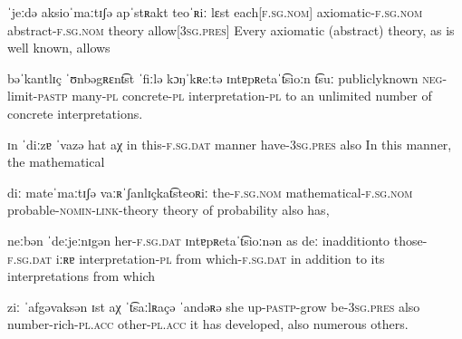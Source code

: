 
              {ˈjeːdə aksioˈmaːtɪʃə apˈstʀakt teoˈʀiː lɛst}
              {each[\textsc{f}.\textsc{sg}.\textsc{nom}] axiomatic-\textsc{f}.\textsc{sg}.\textsc{nom} abstract-\textsc{f}.\textsc{sg}.\textsc{nom} theory allow[3\textsc{sg}.\textsc{pres}]}
              {{Every} {axiomatic} {(abstract)} theory, {as is well known, allows}}

              {bəˈkantlɪç ˈʊnbəgʀɛn\t{ts}t ˈfiːlə kɔŋˈkʀeːtə ɪntɐpʀetaˈ\t{ts}ioːn \t{ts}uː}
              {{publicly{\textunderscore}known} \textsc{neg}-limit-\textsc{pastp} many-\textsc{pl} concrete-\textsc{pl} interpretation-\textsc{pl} to}
              {{an} {unlimited} {number of} concrete interpretations.}

              {ɪn ˈdiːzɐ ˈvazə hat aχ}
              {in this-\textsc{f}.\textsc{sg}.\textsc{dat} manner have-\textsc{3sg}.\textsc{pres} also}
              {In this manner, {the} {mathematical}}

              {diː mateˈmaːtɪʃə vaːʀˈʃanlɪçka\t{ts}teoʀiː}
              {the-\textsc{f}.\textsc{sg}.\textsc{nom} mathematical-\textsc{f}.\textsc{sg}.\textsc{nom} probable-\textsc{nomin}-\textsc{link}-theory}
              {{theory of} {probability} {also has,}}

              {neːbən ˈdeːjeːnɪgən her-\textsc{f}.\textsc{sg}.\textsc{dat} ɪntɐpʀetaˈ\t{ts}ioːnən as deː}
              {{in{\textunderscore}addition{\textunderscore}to} {those-\textsc{f}.\textsc{sg}.\textsc{dat}} iːʀɐ interpretation-\textsc{pl} from which-\textsc{f}.\textsc{sg}.\textsc{dat}}
              {{in addition to}  its interpretations from which}

              {ziː ˈafgəvaksən ɪst aχ ˈ\t{ts}aːlʀaçə ˈandəʀə}
              {she up-\textsc{pastp}-grow be-3\textsc{sg}.\textsc{pres} also number-rich-\textsc{pl}.\textsc{acc} other-\textsc{pl}.\textsc{acc}}
              {it {has} {developed,} also numerous others.}
